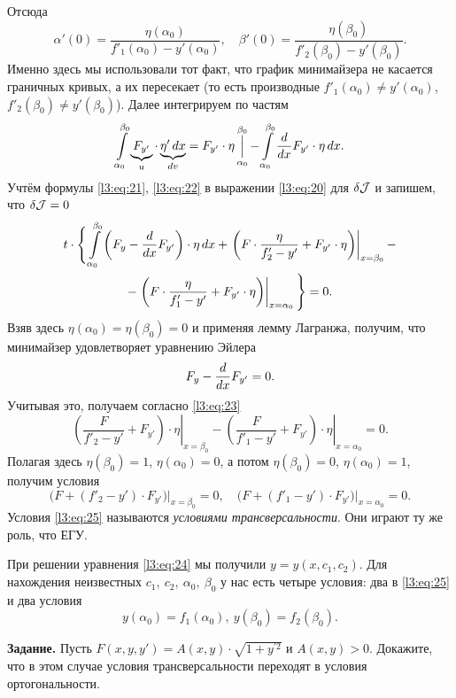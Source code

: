 Отсюда 
\begin{equation}
	\label{l3:eq:21}
	\alpha'(0)=\frac{\eta(\alpha_0)}{f'_1(\alpha_0)-y'(\alpha_0)},\quad \beta'(0)=\frac{\eta(\beta_0)}{f'_2(\beta_0)-y'(\beta_0)}.
\end{equation}
Именно здесь мы использовали тот факт, что график минимайзера не касается граничных кривых, а их пересекает (то есть производные $f'_1(\alpha_0)\neq y'(\alpha_0)$,\ $f'_2(\beta_0)\neq y'(\beta_0)$). Далее интегрируем по частям 
\begin{equation}
	\label{l3:eq:22}
	\int\limits_{\alpha_0}^{\beta_0}\underbrace{F_{y'}}_{u}\cdot\underbrace{\eta'\,dx}_{dv}=F_{y'}\cdot\eta\mathop{\Big|}\limits_{\alpha_0}^{\beta_0}-\int\limits_{\alpha_0}^{\beta_0}\frac{d}{dx}F_{y'}\cdot\eta\,dx.
\end{equation}
Учтём формулы \eqref{l3:eq:21}, \eqref{l3:eq:22} в выражении \eqref{l3:eq:20} для $\delta\mathcal{J}$ и запишем, что $\delta\mathcal{J}=0$
\begin{multline}
	\label{l3:eq:23}
	t\cdot\Bigg\{\int\limits_{\alpha_0}^{\beta_0}\left(F_{y}-\frac{d}{dx}F_{y'}\right)\cdot\eta\,dx+\left.\left(F\cdot\frac{\eta}{f'_2-y'}+F_{y'}\cdot\eta\right)\right|_{x=\beta_0}-\\-\left.\left(F\cdot\frac{\eta}{f'_1-y'}+F_{y'}\cdot\eta\right)\right|_{x=\alpha_0}\Bigg\}=0.
\end{multline}
Взяв здесь $\eta(\alpha_0)=\eta(\beta_0)=0$ и применяя лемму Лагранжа{\mb,} получим, что минимайзер удовлетворяет уравнению Эйлера 
\begin{equation}
	\label{l3:eq:24}
	 F_{y}-\frac{d}{dx}F_{y'}=0.
\end{equation}
Учитывая это{\mb,} получаем согласно \eqref{l3:eq:23} 
\begin{equation*}
	\left.\left(\frac{F}{f'_2-y'}+F_{y'}\right)\cdot\eta\right|_{x=\beta_0}-\left.\left(\frac{F}{f'_1-y'}+F_{y'}\right)\cdot\eta\right|_{x=\alpha_0}=0.
\end{equation*}
Полагая здесь $\eta(\beta_0)=1$, $\eta(\alpha_0)=0$, а потом $\eta(\beta_0)=0$, $\eta(\alpha_0)=1${\mb,} получим условия
\begin{equation}
	\label{l3:eq:25}
	 \Big(F+(f'_2-y')\cdot F_{y'}\Big)\Big|_{x=\beta_0}=0,\quad \Big(F+(f'_1-y')\cdot F_{y'}\Big)\Big|_{x=\alpha_0}=0.
\end{equation}
Условия \eqref{l3:eq:25} называются \emph{условиями трансверсальности}. Они играют ту же роль, что ЕГУ.

При решении уравнения \eqref{l3:eq:24} мы получили $y=y(x,c_1,c_2)$. Для нахождения неизвестных $c_1,\ c_2,\ \alpha_0,\ \beta_0$ у нас есть четыре условия: два в \eqref{l3:eq:25} и два условия
\begin{equation*}
	 y(\alpha_0)=f_1(\alpha_0),\ y(\beta_0)=f_2(\beta_0).
\end{equation*}

\noindent\textbf{Задание. }Пусть $F(x,y,y')=A(x,y)\cdot\sqrt{1+y^{\prime2}}$ и $A(x,y)>0$. Докажите, что в этом случае условия трансверсальности переходят в условия ортогональности. 